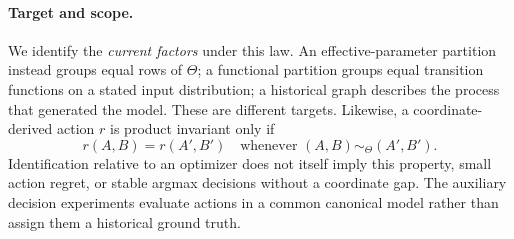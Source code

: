 \paragraph{Target and scope.}
We identify the \emph{current factors} under this law. An effective-parameter
partition instead groups equal rows of $\Theta$; a functional partition
groups equal transition functions on a stated input distribution; a
historical graph describes the process that generated the model. These are
different targets. Likewise, a coordinate-derived action $r$ is product
invariant only if
\begin{equation}
 r(A,B)=r(A',B')\quad\text{whenever }(A,B)\sim_\Theta(A',B').
 \label{eq:action_invariance}
\end{equation}
Identification relative to an optimizer does not itself imply this property,
small action regret, or stable argmax decisions without a coordinate gap.
The auxiliary decision experiments evaluate actions in a common canonical
model rather than assign them a historical ground truth.
